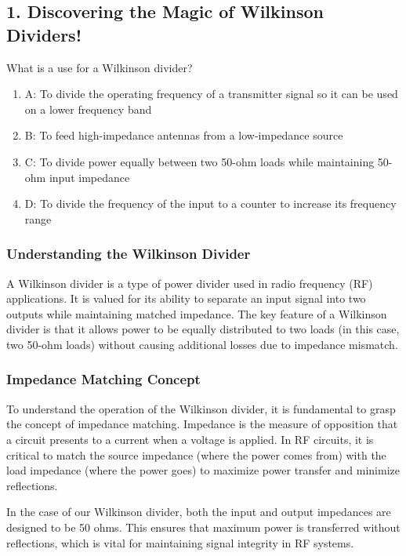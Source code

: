 \subsection{1. Discovering the Magic of Wilkinson Dividers!}

\begin{tcolorbox}[colback=gray!10, colframe=black, title=E9E08] What is a use for a Wilkinson divider?
\begin{enumerate}
    \item A: To divide the operating frequency of a transmitter signal so it can be used on a lower frequency band
    \item B: To feed high-impedance antennas from a low-impedance source
    \item C: To divide power equally between two 50-ohm loads while maintaining 50-ohm input impedance
    \item D: To divide the frequency of the input to a counter to increase its frequency range
\end{enumerate} \end{tcolorbox}



\subsubsection{Understanding the Wilkinson Divider}

A Wilkinson divider is a type of power divider used in radio frequency (RF) applications. It is valued for its ability to separate an input signal into two outputs while maintaining matched impedance. The key feature of a Wilkinson divider is that it allows power to be equally distributed to two loads (in this case, two 50-ohm loads) without causing additional losses due to impedance mismatch.

\subsubsection{Impedance Matching Concept}

To understand the operation of the Wilkinson divider, it is fundamental to grasp the concept of impedance matching. Impedance is the measure of opposition that a circuit presents to a current when a voltage is applied. In RF circuits, it is critical to match the source impedance (where the power comes from) with the load impedance (where the power goes) to maximize power transfer and minimize reflections.

In the case of our Wilkinson divider, both the input and output impedances are designed to be 50 ohms. This ensures that maximum power is transferred without reflections, which is vital for maintaining signal integrity in RF systems.

